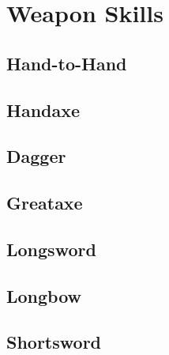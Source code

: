 \section{Weapon Skills}

\subsection{Hand-to-Hand}\label{skill:hand-to-hand}

\subsection{Handaxe}\label{skill:handaxe}

\subsection{Dagger}\label{skill:dagger}

\subsection{Greataxe}\label{skill:greataxe}

\subsection{Longsword}\label{skill:longsword}

\subsection{Longbow}\label{skill:longbow}

\subsection{Shortsword}\label{skill:shortsword}
